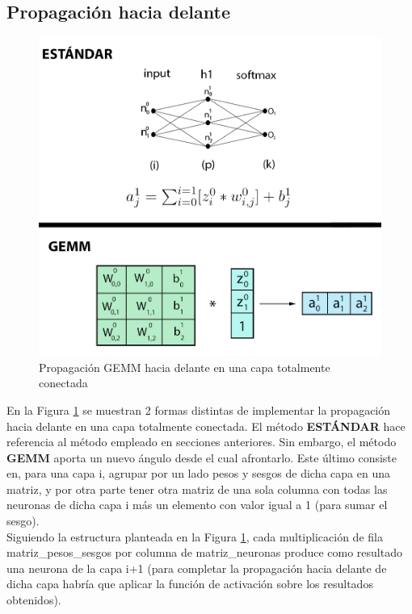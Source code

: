 \subsection{Propagación hacia delante}

\begin{figure}[H]
	\centering
	\includegraphics[scale=0.3]{imagenes/gemm_fully_forward.jpg}  
	\caption{Propagación GEMM hacia delante en una capa totalmente conectada}
	\label{fig:gemm_fully_forward}
\end{figure}

En la Figura \ref{fig:gemm_fully_forward} se muestran 2 formas distintas de implementar la propagación hacia delante en una capa totalmente conectada. El método \textbf{ESTÁNDAR} hace referencia al método empleado en secciones anteriores. Sin embargo, el método \textbf{GEMM} aporta un nuevo ángulo desde el cual afrontarlo. Este último consiste en, para una capa i, agrupar por un lado pesos y sesgos de dicha capa en una matriz, y por otra parte tener otra matriz de una sola columna con todas las neuronas de dicha capa i más un elemento con valor igual a 1 (para sumar el sesgo). \\
Siguiendo la estructura planteada en la Figura \ref{fig:gemm_fully_forward}, cada multiplicación de fila matriz\_pesos\_sesgos por columna de matriz\_neuronas produce como resultado una neurona de la capa i+1 (para completar la propagación hacia delante de dicha capa habría que aplicar la función de activación sobre los resultados obtenidos).

